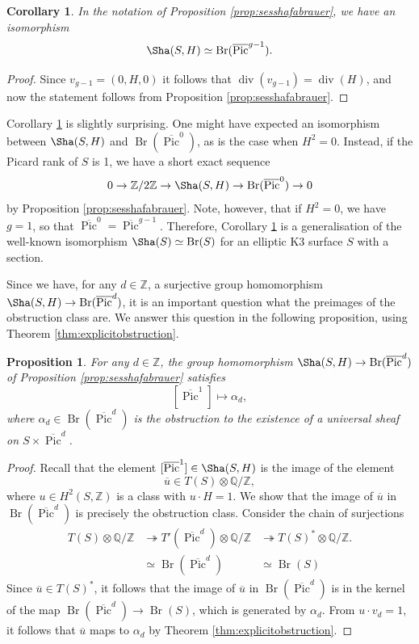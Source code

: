 \documentclass[11pt,twoside]{amsart}
\numberwithin{equation}{section}
\newtheorem{corollary}[dummy]{Corollary}
\newtheorem{proposition}[dummy]{Proposition}
\theoremstyle{definition}
\theoremstyle{plain}
\newcommand{\Z}{\ensuremath{\mathbb{Z}}}
\newcommand{\Q}{\ensuremath{\mathbb{Q}}}
\def\olPic{\overline{\operatorname{Pic}}}
\def\Br{\operatorname{Br}}
\def\ol{\overline}
\def\dv{\operatorname{div}}
\begin{document}
\begin{corollary}\label{cor:isom-sha--brg-1}
    In the notation of Proposition \ref{prop:sesshafabrauer}, we have an isomorphism $$\Sha(S,H)\simeq \Br(\olPic^{g-1}).$$
\end{corollary}
\begin{proof}
    Since $v_{g-1} = (0,H,0)$ it follows that $\dv(v_{g-1}) = \dv(H)$, and now the statement follows from Proposition \ref{prop:sesshafabrauer}.  
\end{proof}

Corollary \ref{cor:isom-sha--brg-1} is slightly surprising. One might have expected an isomorphism between $\Sha(S,H)$ and $\Br(\olPic^0)$, as is the case when $H^2=0$. Instead, if the Picard rank of $S$ is 1, we have a short exact sequence $$0\to \Z/2\Z\to \Sha(S,H)\to \Br(\olPic^0)\to 0$$ by Proposition \ref{prop:sesshafabrauer}. Note, however, that if $H^2 = 0$, we have $g=1$, so that $\olPic^0 = \olPic^{g-1}$. Therefore, Corollary \ref{cor:isom-sha--brg-1} is a generalisation of the well-known isomorphism $\Sha(S)\simeq \Br(S)$ for an elliptic K3 surface $S$ with a section.

Since we have, for any $d\in \Z$, a surjective group homomorphism $\Sha(S,H)\to \Br(\olPic^d)$, it is an important question what the preimages of the obstruction class are. We answer this question in the following proposition, using Theorem \ref{thm:explicitobstruction}.

\begin{proposition}\label{prop:piconemapstoobstruction}
    For any $d\in \Z$, the group homomorphism $\Sha(S,H)\to \Br(\olPic^d)$ of Proposition \ref{prop:sesshafabrauer} satisfies $$[\olPic^1]\mapsto \alpha_d,$$ where $\alpha_d\in \Br(\olPic^d)$ is the obstruction to the existence of a universal sheaf on $S\times \olPic^d$.
\end{proposition}
\begin{proof}
Recall that the element $[\olPic^1]\in \Sha(S,H)$ is the image of the element $$\ol{u}\in T(S)\otimes \Q/\Z,$$ where $u\in H^2(S,\Z)$ is a class with $u\cdot H = 1$. We show that the image of $\overline{u}$ in $\Br(\olPic^d)$ is precisely the obstruction class. Consider the chain of surjections 
\begin{equation*}
    \begin{array}{rrr}
         T(S)\otimes \Q/\Z &\twoheadrightarrow T'(\olPic^d)\otimes \Q/\Z&\twoheadrightarrow T(S)^*\otimes \Q/\Z.  \\
         & \simeq \Br(\olPic^d) & \simeq \Br(S)
    \end{array}
\end{equation*}
Since $\ol{u}\in T(S)^*$, it follows that the image of $\ol{u}$ in $\Br(\olPic^d)$ is in the kernel of the map $\Br(\olPic^d)\to \Br(S)$, which is generated by $\alpha_d$. From $u\cdot v_d = 1$, it follows that $\overline{u}$ maps to $\alpha_d$ by Theorem \ref{thm:explicitobstruction}.
\end{proof}
\end{document}
